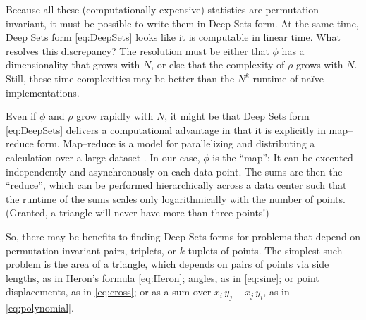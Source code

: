 \documentclass[10pt]{article}
\begin{document}
Because all these (computationally expensive) statistics are permutation-invariant, it must be possible to write them in Deep Sets form.
At the same time, Deep Sets form \eqref{eq:DeepSets} looks like it is computable in linear time.
What resolves this discrepancy?
The resolution must be either that $\phi$ has a dimensionality that grows with $N$, or else that the complexity of $\rho$ grows with $N$.
Still, these time complexities may be better than the $N^k$ runtime of na\"ive implementations.

Even if $\phi$ and $\rho$ grow rapidly with $N$, it might be that Deep Sets form \eqref{eq:DeepSets} delivers a computational advantage in that it is explicitly in map--reduce form.
Map--reduce is a model for parallelizing and distributing a calculation over a large dataset \citep{DeanGhemawat2008,Lammel2008}.
In our case, $\phi$ is the ``map'':
It can be executed independently and asynchronously on each data point.
The sums are then the ``reduce'', which can be performed hierarchically across a data center such that the runtime of the sums scales only logarithmically with the number of points.
(Granted, a triangle will never have more than three points!)

So, there may be benefits to finding Deep Sets forms for problems that depend on permutation-invariant pairs, triplets, or $k$-tuplets of points.
The simplest such problem is the area of a triangle, 
which depends on pairs of points via
side lengths, as in Heron's formula \eqref{eq:Heron};
angles, as in \eqref{eq:sine};
or point displacements, as in \eqref{eq:cross};
or as a sum over $x_i \, y_j - x_j \, y_i$, as in \eqref{eq:polynomial}.
\end{document}
